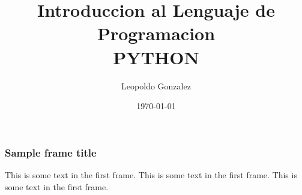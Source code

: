 \documentclass{beamer}
\title{Introduccion al Lenguaje de Programacion \\ PYTHON}
\author{Leopoldo Gonzalez}
\institute{Instituto de Neurobiologia \\ \textbf{UNAM}}
\date{\today}
\begin{document}
\frame{\titlepage}

\begin{frame}
\frametitle{Sample frame title}
This is some text in the first frame. This is some text in the first frame. This is some text in the first frame.
\end{frame}

%


\end{document}
